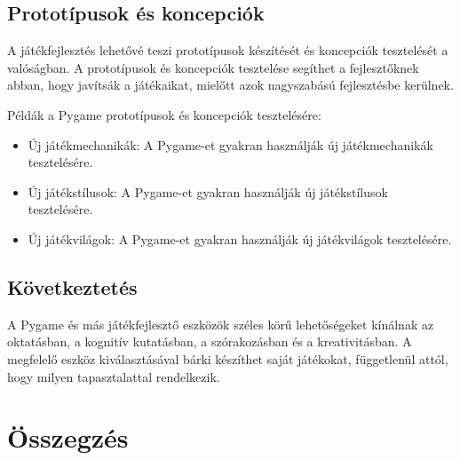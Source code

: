 \subsection{Prototípusok és koncepciók}
A játékfejlesztés lehetővé teszi prototípusok készítését és koncepciók tesztelését a valóságban. A prototípusok és koncepciók tesztelése segíthet a fejlesztőknek abban, hogy javítsák a játékaikat, mielőtt azok nagyszabású fejlesztésbe kerülnek.

Példák a Pygame prototípusok és koncepciók tesztelésére:
\begin{itemize}
    
    \item Új játékmechanikák: A Pygame-et gyakran használják új játékmechanikák tesztelésére.
    \item Új játékstílusok: A Pygame-et gyakran használják új játékstílusok tesztelésére.
    \item Új játékvilágok: A Pygame-et gyakran használják új játékvilágok tesztelésére.
\end{itemize}

\subsection{Következtetés}

A Pygame és más játékfejlesztő eszközök széles körű lehetőségeket kínálnak az oktatásban, a kognitív kutatásban, a szórakozásban és a kreativitásban. A megfelelő eszköz kiválasztásával bárki készíthet saját játékokat, függetlenül attól, hogy milyen tapasztalattal rendelkezik.



\section{Összegzés}

